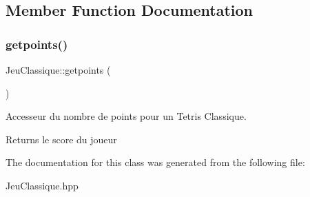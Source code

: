 \subsection{Member Function Documentation}
\mbox{\label{classJeuClassique_ab6429ffc180431b667e891e329c91cb4}} 
\subsubsection{\texorpdfstring{getpoints()}{getpoints()}}
{\footnotesize\ttfamily Jeu\+Classique\+::getpoints (\begin{DoxyParamCaption}{ }\end{DoxyParamCaption})}



Accesseur du nombre de points pour un Tetris Classique. 

\begin{DoxyReturn}{Returns}
le score du joueur 
\end{DoxyReturn}


The documentation for this class was generated from the following file\+:\begin{DoxyCompactItemize}
\item 
Jeu\+Classique.\+hpp\end{DoxyCompactItemize}

